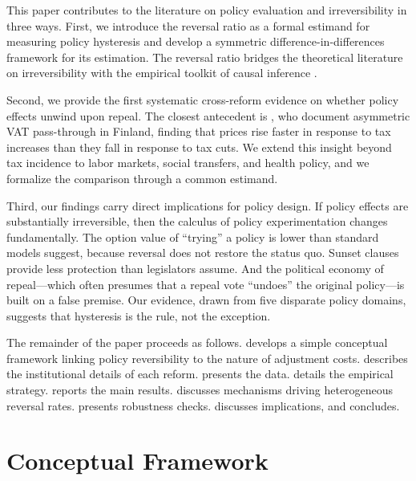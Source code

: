 \documentclass[12pt]{article}
\begin{document}
This paper contributes to the literature on policy evaluation and irreversibility in three ways. First, we introduce the reversal ratio as a formal estimand for measuring policy hysteresis and develop a symmetric difference-in-differences framework for its estimation. The reversal ratio bridges the theoretical literature on irreversibility \citep{dixit1994investment} with the empirical toolkit of causal inference \citep{angrist2010credibility, roth2023s}.

Second, we provide the first systematic cross-reform evidence on whether policy effects unwind upon repeal. The closest antecedent is \citet{benzarti2020really}, who document asymmetric VAT pass-through in Finland, finding that prices rise faster in response to tax increases than they fall in response to tax cuts. We extend this insight beyond tax incidence to labor markets, social transfers, and health policy, and we formalize the comparison through a common estimand.

Third, our findings carry direct implications for policy design. If policy effects are substantially irreversible, then the calculus of policy experimentation changes fundamentally. The option value of ``trying'' a policy is lower than standard models suggest, because reversal does not restore the status quo. Sunset clauses provide less protection than legislators assume. And the political economy of repeal---which often presumes that a repeal vote ``undoes'' the original policy---is built on a false premise. Our evidence, drawn from five disparate policy domains, suggests that hysteresis is the rule, not the exception.

The remainder of the paper proceeds as follows.  develops a simple conceptual framework linking policy reversibility to the nature of adjustment costs.  describes the institutional details of each reform.  presents the data.  details the empirical strategy.  reports the main results.  discusses mechanisms driving heterogeneous reversal rates.  presents robustness checks.  discusses implications, and  concludes.

\section{Conceptual Framework}
\label{sec:framework}
\end{document}
